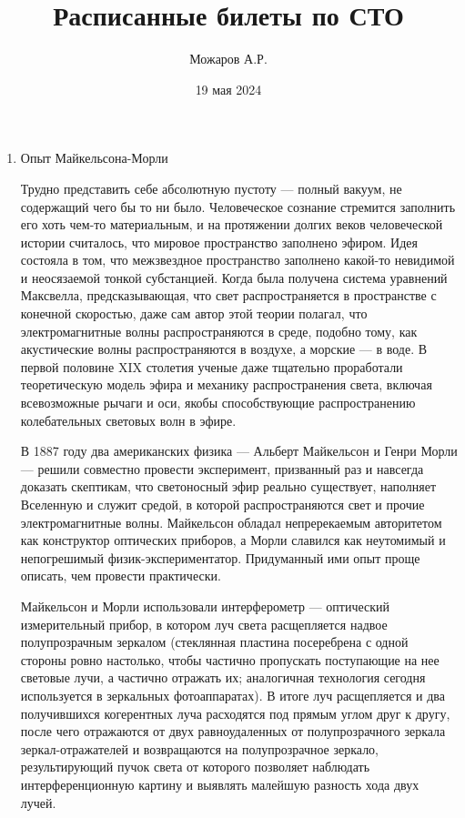 \documentclass{article}
\author{Можаров А.Р.}
\date{19 мая 2024}
\title{Расписанные билеты по СТО}
\begin{document}
\maketitle
\begin{enumerate}
    \item Опыт Майкельсона-Морли

          Трудно представить себе абсолютную пустоту — полный вакуум, не содержащий чего бы то ни было. Человеческое сознание стремится заполнить его хоть чем-то материальным, и на протяжении долгих веков человеческой истории считалось, что мировое пространство заполнено эфиром. Идея состояла в том, что межзвездное пространство заполнено какой-то невидимой и неосязаемой тонкой субстанцией. Когда была получена система уравнений Максвелла, предсказывающая, что свет распространяется в пространстве с конечной скоростью, даже сам автор этой теории полагал, что электромагнитные волны распространяются в среде, подобно тому, как акустические волны распространяются в воздухе, а морские — в воде. В первой половине XIX столетия ученые даже тщательно проработали теоретическую модель эфира и механику распространения света, включая всевозможные рычаги и оси, якобы способствующие распространению колебательных световых волн в эфире.

          В 1887 году два американских физика — Альберт Майкельсон и Генри Морли — решили совместно провести эксперимент, призванный раз и навсегда доказать скептикам, что светоносный эфир реально существует, наполняет Вселенную и служит средой, в которой распространяются свет и прочие электромагнитные волны. Майкельсон обладал непререкаемым авторитетом как конструктор оптических приборов, а Морли славился как неутомимый и непогрешимый физик-экспериментатор. Придуманный ими опыт проще описать, чем провести практически.

          Майкельсон и Морли использовали интерферометр — оптический измерительный прибор,
          в котором луч света расщепляется надвое полупрозрачным зеркалом
          (стеклянная пластина посеребрена с одной стороны ровно настолько,
          чтобы частично пропускать поступающие на нее световые лучи,
          а частично отражать их;
          аналогичная технология сегодня используется в зеркальных фотоаппаратах).
          В итоге луч расщепляется и два получившихся когерентных луча расходятся
          под прямым углом друг к другу, после чего отражаются от двух равноудаленных
          от полупрозрачного зеркала зеркал-отражателей и возвращаются
          на полупрозрачное зеркало, результирующий пучок света
          от которого позволяет наблюдать интерференционную картину
          и выявлять малейшую разность хода двух лучей.


\end{enumerate}
\end{document}

